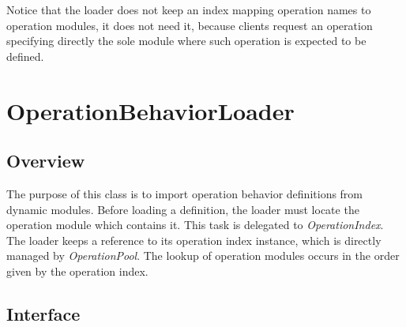 \documentclass[a4paper,twoside]{tce}
\begin{document}
Notice that the loader does not keep an index mapping operation names to
operation modules, it does not need it, because clients request an operation
specifying directly the sole module where such operation is expected to be
defined.


\section{OperationBehaviorLoader}
\label{sec:opBehaviorLoader}

\subsection{Overview}

The purpose of this class is to import operation behavior definitions from
dynamic modules.  Before loading a definition, the loader must locate the
operation module which contains it.  This task is delegated to
\emph{OperationIndex}.  The loader keeps a reference to its operation index
instance, which is directly managed by \emph{OperationPool}.  The lookup of
operation modules occurs in the order given by the operation index.

\subsection{Interface}
\end{document}
